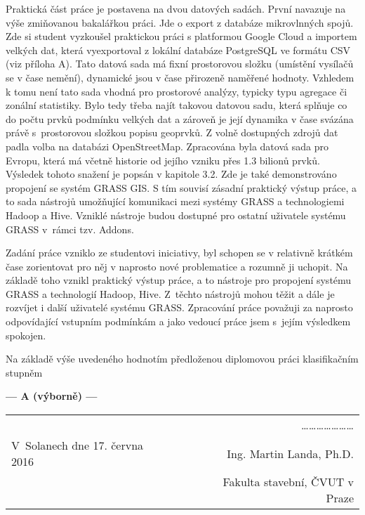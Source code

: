 \documentclass[czech,11pt,a4paper]{article}
\begin{document}
Praktická část práce je postavena na dvou datových sadách. První
navazuje na výše zmiňovanou bakalářkou práci. Jde o export z databáze
mikrovlnných spojů. Zde si student vyzkoušel praktickou práci s
platformou Google Cloud a importem velkých dat, která vyexportoval z
lokální databáze PostgreSQL ve formátu CSV (viz příloha A). Tato
datová sada má fixní prostorovou složku (umístění vysílačů se v čase
nemění), dynamické jsou v čase přirozeně naměřené hodnoty. Vzhledem k
tomu není tato sada vhodná pro prostorové analýzy, typicky typu
agregace či zonální statistiky. Bylo tedy třeba najít takovou datovou
sadu, která splňuje co do počtu prvků podmínku velkých dat a zároveň
je její dynamika v čase svázána právě s~prostorovou složkou popisu
geoprvků. Z volně dostupných zdrojů dat padla volba na databázi
OpenStreetMap. Zpracována byla datová sada pro Evropu, která má včetně
historie od jejího vzniku přes 1.3 bilionů prvků. Výsledek tohoto
snažení je popsán v kapitole 3.2. Zde je také demonstrováno propojení
se systém GRASS GIS. S tím souvisí zásadní praktický výstup práce, a
to sada nástrojů umožňující komunikaci mezi systémy GRASS a
technolo\-giemi Hadoop a Hive. Vzniklé nástroje budou dostupné pro
ostatní uživatele systému GRASS v~rámci tzv. Addons. \newline

Zadání práce vzniklo ze studentovi iniciativy, byl schopen se v
relativně krátkém čase zorientovat pro něj v naprosto nové
problematice a rozumně ji uchopit. Na základě toho vznikl praktický
výstup práce, a to nástroje pro propojení systému GRASS a technologií
Hadoop, Hive. Z~těchto nástrojů mohou těžit a dále je rozvíjet i další
uživatelé systému GRASS. Zpracování práce považuji za naprosto
odpovídající vstupním podmínkám a jako vedoucí práce jsem s~jejím
výsledkem spokojen. \newline

Na základě výše uvedeného hodnotím předloženou diplomovou práci
klasifikačním stupněm

\begin{center}
  {\bf --- A (výborně) --- }
\end{center}

\vskip 2cm

\begin{tabular}{lp{}r}
& & \ldots\ldots\ldots\ldots\ldots\ldots\ldots \\
V~Solanech dne 17. června 2016 & & Ing. Martin Landa, Ph.D. \\
& & Fakulta stavební, ČVUT v Praze \\
\end{tabular}
\end{document}

